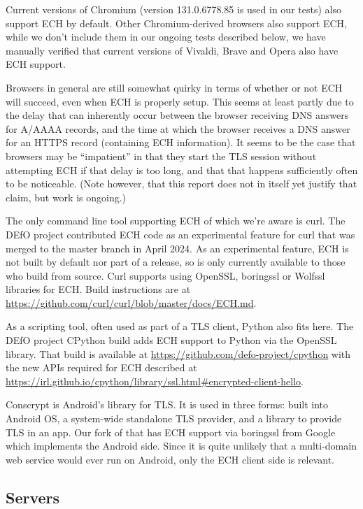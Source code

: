 Current versions of Chromium (version 131.0.6778.85 is used in our tests)
also support ECH by default.
Other Chromium-derived browsers also support ECH, while we don't include them
in our ongoing tests described below, we have manually verified that current
versions of Vivaldi, Brave and Opera also have ECH support.

Browsers in general are still somewhat quirky in terms of whether or not
ECH will succeed, even when ECH is properly setup. This seems at least
partly due to the delay that can inherently occur between the browser
receiving DNS answers for A/AAAA records, and the time at which the
browser receives a DNS answer for an HTTPS record (containing ECH
information). It seems to be the case that browsers may be ``impatient''
in that they start the TLS session without attempting ECH if that
delay is too long, and that that happens sufficiently often to be
noticeable. (Note however, that this report does not in itself yet
justify that claim, but work is ongoing.)

The only command line tool supporting ECH of which we're aware is curl. The
DEfO project
contributed ECH code as an experimental feature for curl that was merged to the
master branch in April 2024. As an experimental feature, ECH is not built by
default nor part of a release, so is only currently available to those who
build from source. Curl supports using OpenSSL, boringssl or Wolfssl libraries
for ECH.  Build instructions are at
\url{https://github.com/curl/curl/blob/master/docs/ECH.md}.

As a scripting tool, often used as part of a TLS client, Python also fits here.
The DEfO project CPython build adds ECH support to Python via the OpenSSL
library.  That build is available at
\url{https://github.com/defo-project/cpython} with the new APIs required for
ECH described at
\url{https://irl.github.io/cpython/library/ssl.html#encrypted-client-hello}.

Conscrypt is Android's library for TLS. It is used in three forms: built into
Android OS, a system-wide standalone TLS provider, and a library to provide TLS
in an app. Our fork of that has ECH support via boringssl from Google 
which implements the Android side. Since it is quite unlikely that a
multi-domain web service would ever run on Android, only the ECH client side is
relevant.

\subsection{Servers}

